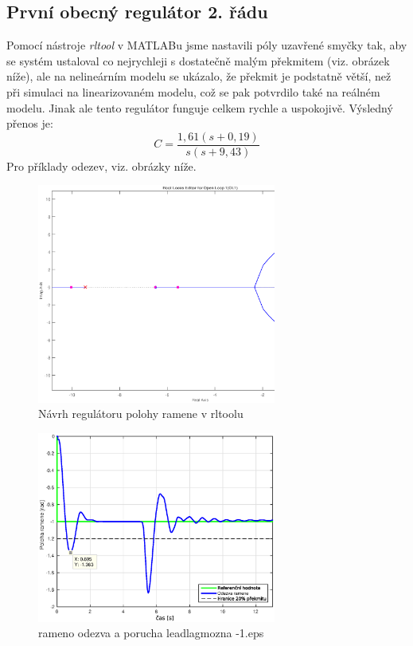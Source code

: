 \documentclass[11pt,a4paper]{article}
\begin{document}
\subsection{První obecný regulátor 2. řádu}
Pomocí nástroje \textit{rltool} v MATLABu jsme nastavili póly uzavřené smyčky tak, aby se systém ustaloval co nejrychleji s dostatečně malým překmitem (viz. obrázek níže), ale na nelineárním modelu se ukázalo, že překmit je podstatně větší, než při simulaci na linearizovaném modelu, což se pak potvrdilo také na reálném modelu. Jinak ale tento regulátor funguje celkem rychle a uspokojivě. Výsledný přenos je:
$$
C = \frac{1,61 (s+0,19)}{ s (s+9,43)}
$$
\newline
Pro příklady odezev, viz. obrázky níže.
\begin{figure}[H]
\centering
\includegraphics[width=0.7\textwidth]{rltool_rameno1.eps}
\caption{Návrh regulátoru polohy ramene v rltoolu}
\label{ram_rltool1}
\end{figure}
\begin{figure}[H]
\centering
\includegraphics[width=0.7\textwidth]{dobre_grafy/rameno_odezva_a_porucha_leadlagmozna_-1.eps}
\caption{rameno odezva a porucha leadlagmozna -1.eps}
\label{ram_ob1}
\end{figure}
\end{document}
